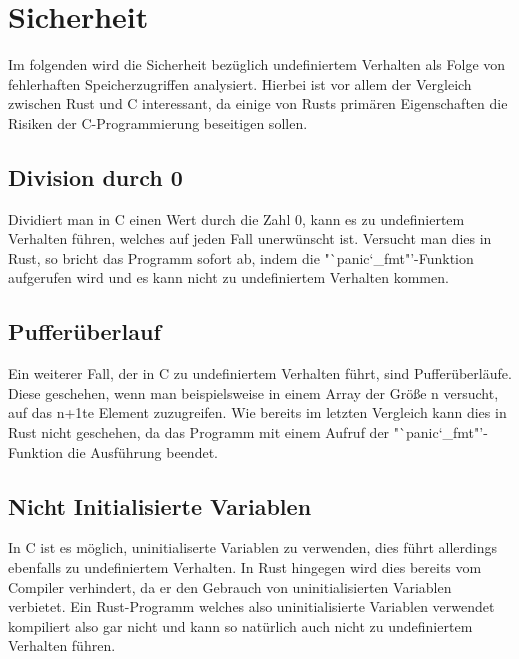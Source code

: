 \section{Sicherheit}

Im folgenden wird die Sicherheit bezüglich undefiniertem Verhalten als Folge von fehlerhaften Speicherzugriffen analysiert.
Hierbei ist vor allem der Vergleich zwischen Rust und C interessant, da einige von Rusts primären Eigenschaften die
Risiken der C-Programmierung beseitigen sollen.

\subsection{Division durch 0}

Dividiert man in C einen Wert durch die Zahl 0, kann es zu undefiniertem Verhalten führen, welches auf jeden Fall unerwünscht
ist. Versucht man dies in Rust, so bricht das Programm sofort ab, indem die "`panic\char`_fmt"'-Funktion aufgerufen wird und es
kann nicht zu undefiniertem Verhalten kommen.

\subsection{Pufferüberlauf}

Ein weiterer Fall, der in C zu undefiniertem Verhalten führt, sind Pufferüberläufe. Diese geschehen, wenn man beispielsweise
in einem Array der Größe n versucht, auf das n+1te Element zuzugreifen. Wie bereits im letzten Vergleich kann dies in 
Rust nicht geschehen, da das Programm mit einem Aufruf der "`panic\char`_fmt"'-Funktion die Ausführung beendet.

\subsection{Nicht Initialisierte Variablen}

In C ist es möglich, uninitialiserte Variablen zu verwenden, dies führt allerdings ebenfalls zu undefiniertem Verhalten.
In Rust hingegen wird dies bereits vom Compiler verhindert, da er den Gebrauch von uninitialisierten Variablen verbietet.
Ein Rust-Programm welches also uninitialisierte Variablen verwendet kompiliert also gar nicht und kann so natürlich auch nicht
zu undefiniertem Verhalten führen.









